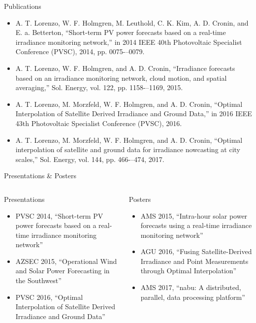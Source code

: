 \documentclass[aspectratio=169]{beamer}
\begin{document}
\begin{frame}{Publications}
\fontsize{8}{12}
\begin{itemize}
  \item  A. T. Lorenzo, W. F. Holmgren, M. Leuthold, C. K. Kim,
  A. D. Cronin, and E. a. Betterton, ``Short-term PV power forecasts
  based on a real-time irradiance monitoring network,'' in 2014 IEEE
  40th Photovoltaic Specialist Conference (PVSC), 2014, pp. 0075-–0079.
\item A. T. Lorenzo, W. F. Holmgren, and A. D. Cronin, ``Irradiance
  forecasts based on an irradiance monitoring network, cloud motion,
  and spatial averaging,'' Sol. Energy, vol. 122, pp. 1158-–1169, 2015.
\item A. T. Lorenzo, M. Morzfeld, W. F. Holmgren, and A. D. Cronin,
  ``Optimal Interpolation of Satellite Derived Irradiance and Ground
  Data,'' in 2016 IEEE 43th Photovoltaic Specialist Conference (PVSC),
  2016.
\item A. T. Lorenzo, M. Morzfeld, W. F. Holmgren, and A. D. Cronin, ``Optimal interpolation of satellite and ground data for irradiance nowcasting at city scales,'' Sol. Energy, vol. 144, pp. 466-–474, 2017.
\end{itemize}
\end{frame}

\begin{frame}{Presentations \& Posters}
\fontsize{8}{12}
\begin{columns}
\begin{column}{0.5 \textwidth}
Presentations
\begin{itemize}
  \item  PVSC 2014, ``Short-term PV power forecasts
  based on a real-time irradiance monitoring network''
\item AZSEC 2015, ``Operational Wind and Solar Power Forecasting in
  the Southwest''
\item PVSC 2016, ``Optimal Interpolation of Satellite Derived Irradiance and Ground
  Data''
\end{itemize}
\end{column}
\begin{column}{0.5\textwidth}
Posters
\begin{itemize}
\item AMS 2015, ``Intra-hour solar power forecasts using a real-time
  irradiance monitoring network''
\item AGU 2016, ``Fusing Satellite-Derived Irradiance and Point
  Measurements through Optimal Interpolation''
\item AMS 2017, ``nabu: A distributed, parallel, data processing platform''
\end{itemize}
\end{column}
\end{columns}
\end{frame}
\end{document}
